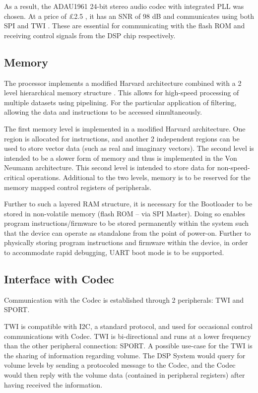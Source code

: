 As a result, the ADAU1961 24-bit stereo audio codec with integrated PLL was chosen. At a price of £2.5 \autocite{digikeyCodec}, it has an SNR of 98 dB and communicates using both SPI and TWI \autocite{codec_datasheet}. These are essential for communicating with the flash ROM and receiving control signals from the DSP chip respectively.



\subsection{Memory}
The processor implements a modified Harvard architecture combined with a 2 level hierarchical memory structure \autocite{blackfinDSP}. This allows for high-speed processing of multiple datasets using pipelining. For the particular application of filtering, allowing the data and instructions to be accessed simultaneously.

The first memory level is implemented in a modified Harvard architecture. One region is allocated for instructions, and another 2 independent regions can be used to store vector data (such as real and imaginary vectors). The second level is intended to be a slower form of memory and thus is implemented in the Von Neumann architecture. This second level is intended to store data for non-speed-critical operations. Additional to the two levels, memory is to be reserved for the memory mapped control registers of peripherals. 

Further to such a layered RAM structure, it is necessary for the Bootloader to be stored in non-volatile memory (flash ROM – via SPI Master). Doing so enables program instructions/firmware to be stored permanently within the system such that the device can operate as standalone from the point of power-on. Further to physically storing program instructions and firmware within the device, in order to accommodate rapid debugging, UART boot mode is to be supported.

\subsection{Interface with Codec}
Communication with the Codec is established through 2 peripherals: TWI and SPORT.

TWI is compatible with I2C, a standard protocol, and used for occasional control communications with Codec. TWI is bi-directional and runs at a lower frequency than the other peripheral connection: SPORT. 
A possible use-case for the TWI is the sharing of information regarding volume. The DSP System would query for volume levels by sending a protocoled message to the Codec, and the Codec would then reply with the volume data (contained in peripheral registers) after having received the information.

